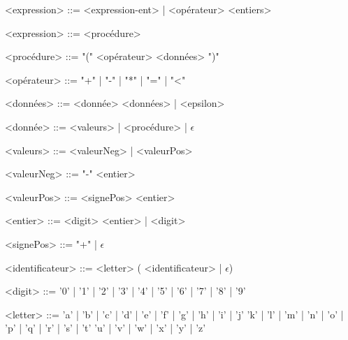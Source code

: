 
	\begin{grammarC}{<expression> ::= <expression-ent> | <opérateur> <entiers>}
		
		<expression> ::= <procédure>
		
		<procédure> ::= "(" <opérateur> <données> ")"
				
		<opérateur> ::= "+" | "-" | "*" | "=" | "<" 
		
		<données> ::= <donnée> <données> | <epsilon>
		
		<donnée> ::= <valeurs> | <procédure> | $\epsilon$
		
		<valeurs> ::= <valeurNeg> | <valeurPos>
		
		<valeurNeg> ::= "-" <entier>
		
		<valeurPos> ::= <signePos> <entier>
		
		<entier> ::= <digit> <entier> | <digit>

		<signePos> ::= "+" | $\epsilon$ 
		
		<identificateur> ::= <letter> ( <identificateur> | $\epsilon$)
		
		<digit> ::= '0' | '1' | '2' | '3' | '4' | '5' | '6' | '7' | '8' | '9'
		
		<letter> ::= 'a' | 'b' | 'c' | 'd' | 'e' | 'f' | 'g' | 'h' | 'i' | 'j'
			    \alt 'k' | 'l' | 'm' | 'n' | 'o' | 'p' | 'q' | 'r' | 's' | 't'
				\alt 'u' | 'v' | 'w' | 'x' | 'y' | 'z'
		
		
	\end{grammarC}

